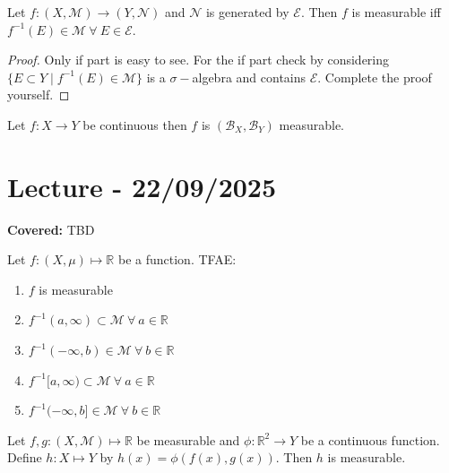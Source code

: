 \documentclass{functionspaces}
\begin{document}
\begin{proposition}
Let $f:(X,\mathcal{M}) \to (Y,\mathcal{N})$ and $\mathcal{N}$ is generated by $\mathcal{E}$. Then $f$ is measurable iff $f^{-1}(E) \in \mathcal{M}\ \forall\ E \in \mathcal{E}$.
\end{proposition}

\begin{proof}
Only if part is easy to see. For the if part check by considering $\{E \subset Y \mid f^{-1}(E) \in \mathcal{M}\}$ is a $\sigma-$algebra and contains $\mathcal{E}$. Complete the proof yourself.
\end{proof}

\begin{corollary}
Let $f:X \to Y$ be continuous then $f$ is $(\mathcal{B}_{X},\mathcal{B}_{Y})$ measurable.
\end{corollary}

\endgroup


\newpage
\section{Lecture - 22/09/2025}

\textbf{Covered:} TBD

\begingroup
\setlength{\parskip}{6pt}
\setlength{\parindent}{0pt}

\begin{proposition}
Let $f:(X,\mu) \mapsto \mathbb{R}$ be a function. TFAE:

\begin{enumerate}
    \item $f$ is measurable
    \item $f^{-1}(a,\infty) \subset \mathcal{M}\ \forall\ a \in \mathbb{R}$
    \item $f^{-1}(-\infty,b) \in \mathcal{M}\ \forall\ b \in \mathbb{R}$
    \item $f^{-1}[a,\infty) \subset \mathcal{M}\ \forall\ a \in \mathbb{R}$
    \item $f^{-1}(-\infty,b] \in \mathcal{M}\ \forall\ b \in \mathbb{R}$
\end{enumerate}
\end{proposition}

\begin{proposition}
Let $f,g:(X,\mathcal{M}) \mapsto \mathbb{R}$ be measurable and $\phi:\mathbb{R}^{2} \to Y$ be a continuous function. Define $h:X \mapsto Y$ by $h(x) = \phi(f(x),g(x))$. Then $h$ is measurable.
\end{proposition}
\end{document}

